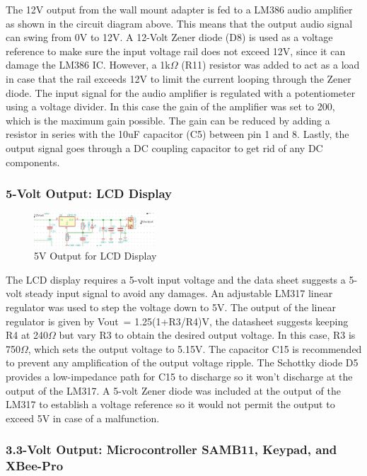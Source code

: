 \documentclass[journal,compsoc]{IEEEtran}
\begin{document}
The 12V output from the wall mount adapter is fed to a LM386 audio amplifier as shown in the circuit diagram above. This means that the output audio signal can swing from 0V to 12V. A 12-Volt Zener diode (D8) is used as a voltage reference to make sure the input voltage rail does not exceed 12V, since it can damage the LM386 IC. However, a 1k$\Omega$ (R11) resistor was added to act as a load in case that the rail exceeds 12V to limit the current looping through the Zener diode. The input signal for the audio amplifier is regulated with a potentiometer using a voltage divider. In this case the gain of the amplifier was set to 200, which is the maximum gain possible. The gain can be reduced by adding a resistor in series with the 10uF capacitor (C5) between pin 1 and 8. Lastly, the output signal goes through a DC coupling capacitor to get rid of any DC components. 

\subsubsection {5-Volt Output: LCD Display}

\begin{figure}[ht]	%
\centering
\includegraphics[width=0.4\textwidth]{Linear.png}
\caption{ 5V Output for LCD Display }
\label{Pdisplay}
\end{figure}

The LCD display requires a 5-volt input voltage and the data sheet suggests a 5-volt steady input signal to avoid any damages.  An adjustable LM317 linear regulator was used to step the voltage down to 5V.  The output of the linear regulator is given by Vout~= 1.25(1+R3/R4)V, the datasheet suggests keeping R4 at 240$\Omega$ but vary R3 to obtain the desired output voltage.  In this case, R3 is 750$\Omega$, which sets the output voltage to 5.15V.  The capacitor C15 is recommended to prevent any amplification of the output voltage ripple.  The Schottky diode D5 provides a low-impedance path for C15 to discharge so it won’t discharge at the output of the LM317.  A 5-volt Zener diode was included at the output of the LM317 to establish a voltage reference so it would not permit the output to exceed 5V in case of a malfunction.

\subsubsection {3.3-Volt Output: Microcontroller SAMB11, Keypad, and XBee-Pro}
\end{document}
